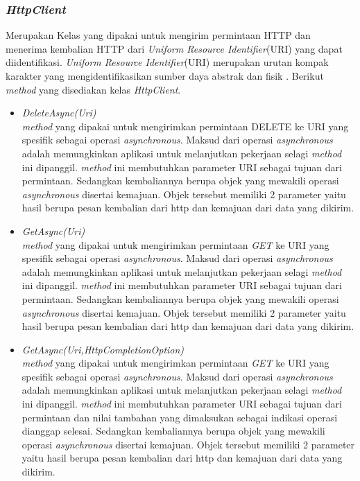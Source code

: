 \subsubsection{\textit{HttpClient}}
\label{subsubsec:Kelas HttpClient}
\hspace{0.5cm} Merupakan Kelas yang dipakai untuk mengirim permintaan HTTP dan menerima kembalian HTTP dari \textit{Uniform Resource Identifier}(URI) yang dapat diidentifikasi. \textit{Uniform Resource Identifier}(URI) merupakan urutan kompak karakter yang mengidentifikasikan sumber daya abstrak dan fisik \cite{rfc3986}. Berikut \textit{method} yang disediakan kelas \textit{HttpClient}.
\begin{itemize}
	\item \textit{DeleteAsync(Uri)} \\
	\textit{method} yang dipakai untuk mengirimkan permintaan DELETE ke URI yang spesifik sebagai operasi \textit{asynchronous}. Maksud dari operasi \textit{asynchronous} adalah memungkinkan aplikasi untuk melanjutkan pekerjaan selagi \textit{method} ini dipanggil\footnotemark[2]. \textit{method} ini membutuhkan parameter URI sebagai tujuan dari permintaan. Sedangkan kembaliannya berupa objek yang mewakili operasi \textit{asynchronous} disertai kemajuan. Objek tersebut memiliki 2 parameter yaitu hasil berupa pesan kembalian dari http dan kemajuan dari data yang dikirim.
	\item \textit{GetAsync(Uri)} \\
	\textit{method} yang dipakai untuk mengirimkan permintaan \textit{GET} ke URI yang spesifik sebagai operasi \textit{asynchronous}. Maksud dari operasi \textit{asynchronous} adalah memungkinkan aplikasi untuk melanjutkan pekerjaan selagi \textit{method} ini dipanggil\footnotemark[2]. \textit{method} ini membutuhkan parameter URI sebagai tujuan dari permintaan. Sedangkan kembaliannya berupa objek yang mewakili operasi \textit{asynchronous} disertai kemajuan. Objek tersebut memiliki 2 parameter yaitu hasil berupa pesan kembalian dari http dan kemajuan dari data yang dikirim.
	\item \textit{GetAsync(Uri,HttpCompletionOption)} \\
	\textit{method} yang dipakai untuk mengirimkan permintaan \textit{GET} ke URI yang spesifik sebagai operasi \textit{asynchronous}. Maksud dari operasi \textit{asynchronous} adalah memungkinkan aplikasi untuk melanjutkan pekerjaan selagi \textit{method} ini dipanggil\footnotemark[2]. \textit{method} ini membutuhkan parameter URI sebagai tujuan dari permintaan dan nilai tambahan yang dimaksukan sebagai indikasi operasi dianggap selesai. Sedangkan kembaliannya berupa objek yang mewakili operasi \textit{asynchronous} disertai kemajuan. Objek tersebut memiliki 2 parameter yaitu hasil berupa pesan kembalian dari http dan kemajuan dari data yang dikirim.

\end{itemize}
